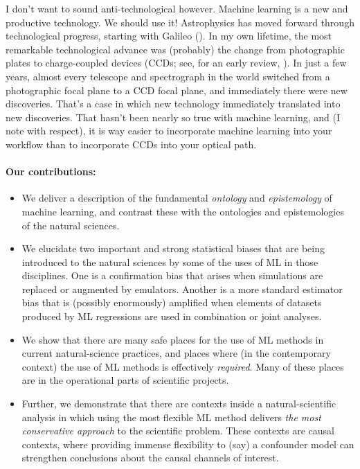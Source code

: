 \documentclass[11pt]{article}
\begin{document}
I don't want to sound anti-technological however.
Machine learning is a new and productive technology.
We should use it!
Astrophysics has moved forward through technological progress, starting with Galileo (\cite{galileo}).
In my own lifetime, the most remarkable technological advance was (probably) the change from photographic plates to charge-coupled devices (CCDs; see, for an early review, \cite{ccd}).
In just a few years, almost every telescope and spectrograph in the world switched from a photographic focal plane to a CCD focal plane, and immediately there were new discoveries.
That's a case in which new technology immediately translated into new discoveries.
That hasn't been nearly so true with machine learning, and (I note with respect), it is way easier to incorporate machine learning into your workflow than to incorporate CCDs into your optical path.

\paragraph{Our contributions:}
\begin{itemize}
  \item We deliver a description of the fundamental \emph{ontology} and \emph{epistemology} of machine learning, and contrast these with the ontologies and epistemologies of the natural sciences.
  \item We elucidate two important and strong statistical biases that are being introduced to the natural sciences by some of the uses of ML in those disciplines. One is a confirmation bias that arises when simulations are replaced or augmented by emulators. Another is a more standard estimator bias that is (possibly enormously) amplified when elements of datasets produced by ML regressions are used in combination or joint analyses.
  \item We show that there are many safe places for the use of ML methods in current natural-science practices, and places where (in the contemporary context) the use of ML methods is effectively \emph{required}. Many of these places are in the operational parts of scientific projects.
  \item Further, we demonstrate that there are contexts inside a natural-scientific analysis in which using the most flexible ML method delivers \emph{the most conservative approach} to the scientific problem. These contexts are causal contexts, where providing immense flexibility to (say) a confounder model can strengthen conclusions about the causal channels of interest.
\end{itemize}
\end{document}
